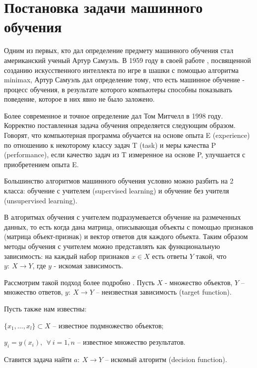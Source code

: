 \section{Постановка задачи машинного обучения}

Одним из первых, кто дал определение предмету машинного обучения стал американский ученый Артур Самуэль. В 1959 году в своей работе \cite{Samuel:ML}, посвященной созданию искусственного интеллекта по игре в шашки с помощью алгоритма minimax, Артур Самуэль дал определение тому, что есть машинное обучение - процесс обучения, в результате которого компьютеры способны показывать поведение, которое в них явно не было заложено.

Более современное и точное определение дал Том Митчелл в 1998 году. Корректно поставленная задача обучения определяется следующим образом. Говорят, что компьютерная программа обучается на основе опыта E (experience) по отношению к некоторому классу задач T (task) и меры качества P (performance), если качество задач из T измеренное на основе P, улучшается с приобретением опыта E.

Большинство алгоритмов машинного обучения условно можно разбить на 2 класса: обучение с учителем (supervised learning) и обучение без учителя (unsupervised learning).

В алгоритмах обучения с учителем подразумевается обучение на размеченных данных, то есть когда дана матрица, описывающая объекты с помощью признаков (матрица объект-признак) и вектор ответов для каждого объекта. Таким образом методы обучения с учителем можно представлять как функциональную зависимость: на каждый набор признаков $x \in X$ есть ответы $Y$ такой, что $y:~X \rightarrow Y$, где $y$ - искомая зависимость.

Рассмотрим такой подход более подробно \cite{coursera:voroncov}. Пусть $X$ - множество объектов, $Y$ -- множество ответов, $y:~X \rightarrow Y$ -- неизвестная зависимость (target function).

Пусть также нам известны:\\
\begin{description}[font=$\bullet$]
    \item $\{ x_1, \dots, x_l \} \subset X $ -- известное подмножество объектов;\\
    \item $y_i = y(x_i),~~\forall~i=\overline{1,n}$ -- известное множество результатов.\\
\end{description}
Ставится задача найти $a:~X \rightarrow Y$ -- искомый алгоритм (decision function).

